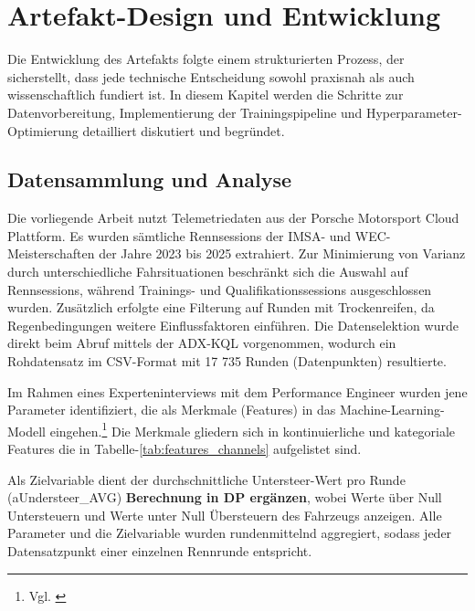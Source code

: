 \chapter{Artefakt-Design und Entwicklung}

Die Entwicklung des Artefakts folgte einem strukturierten Prozess, der sicherstellt, dass jede technische Entscheidung sowohl praxisnah als auch wissenschaftlich fundiert ist. In diesem Kapitel werden die Schritte zur Datenvorbereitung, Implementierung der Trainingspipeline und Hyperparameter-Optimierung detailliert diskutiert und begründet.

\section{Datensammlung und Analyse}

  Die vorliegende Arbeit nutzt Telemetriedaten aus der Porsche Motorsport Cloud Plattform. Es wurden sämtliche Rennsessions der \ac{IMSA}- und \ac{WEC}-Meisterschaften der Jahre 2023 bis 2025 extrahiert. Zur Minimierung von Varianz durch unterschiedliche Fahrsituationen beschränkt sich die Auswahl auf Rennsessions, während Trainings- und Qualifikationssessions ausgeschlossen wurden. Zusätzlich erfolgte eine Filterung auf Runden mit Trockenreifen, da Regenbedingungen weitere Einflussfaktoren einführen. Die Datenselektion wurde direkt beim Abruf mittels der ADX-\ac{KQL} vorgenommen, wodurch ein Rohdatensatz im CSV-Format mit 17 735 Runden (Datenpunkten) resultierte.

  Im Rahmen eines Experteninterviews mit dem Performance Engineer wurden jene Parameter identifiziert, die als Merkmale (Features) in das Machine-Learning-Modell eingehen.\footnote{Vgl. \cite{Experteninterview2}} Die Merkmale gliedern sich in kontinuierliche und kategoriale Features die in Tabelle-\ref{tab:features_channels} aufgelistet sind.



  Als Zielvariable dient der durchschnittliche Untersteer-Wert pro Runde (aUndersteer\_AVG) \textbf{Berechnung in DP ergänzen}, wobei Werte über Null Untersteuern und Werte unter Null Übersteuern des Fahrzeugs anzeigen. Alle Parameter und die Zielvariable wurden rundenmittelnd aggregiert, sodass jeder Datensatzpunkt einer einzelnen Rennrunde entspricht.

